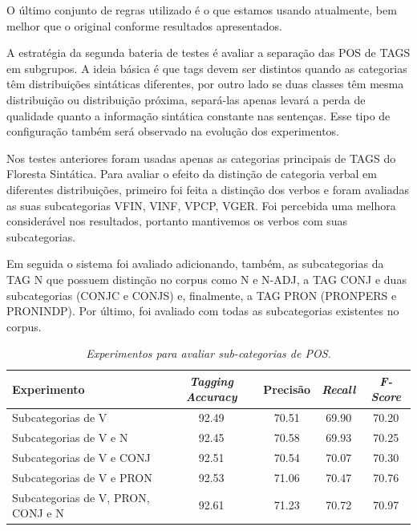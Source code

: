 O último conjunto de regras utilizado é o que estamos usando atualmente, bem melhor que o original conforme resultados apresentados. 

A estratégia da segunda bateria de testes é avaliar a separação das POS de TAGS em subgrupos. A ideia básica é que tags devem ser distintos quando as categorias têm distribuições sintáticas diferentes, por outro lado se duas classes têm mesma distribuição ou distribuição próxima, separá-las apenas levará a perda de qualidade quanto a informação sintática constante nas sentenças. Esse tipo de configuração também será observado na evolução dos experimentos.

Nos testes anteriores foram usadas apenas as categorias principais de TAGS do Floresta Sintática. Para avaliar o efeito da distinção de categoria verbal em diferentes distribuições, primeiro foi feita a distinção dos verbos e foram avaliadas as suas subcategorias VFIN, VINF, VPCP, VGER. Foi percebida uma melhora considerável nos resultados, portanto mantivemos os verbos com suas subcategorias. 

Em seguida o sistema foi avaliado adicionando, também, as subcategorias da TAG N que possuem distinção no corpus como N e N-ADJ, a TAG CONJ e duas subcategorias (CONJC e CONJS) e, finalmente, a TAG PRON (PRONPERS e PRONINDP). Por último, foi avaliado com todas as subcategorias existentes no corpus.


\begin{table}[H]
\centering
\footnotesize
\caption{\it Experimentos para avaliar sub-categorias de POS.}
	\begin{tabular}{|l|c|c|c|c|}
		\hline
		\textbf{Experimento} &  \textbf{\emph{Tagging Accuracy}} & \textbf{Precisão} & \textbf{\emph{Recall}} & \textbf{\emph{F-Score}} \\
		\hline
		Subcategorias de V & 92.49 & 70.51 & 69.90 & 70.20\\
		\hline		
		Subcategorias de V e N & 92.45 & 70.58 & 69.93 & 70.25\\
		\hline		
		Subcategorias de V e CONJ & 92.51 & 70.54 & 70.07 & 70.30\\
		\hline		
		Subcategorias de V e PRON & 92.53 & 71.06 & 70.47 & 70.76\\
		\hline
		Subcategorias de V, PRON, CONJ e N & 92.61 & 71.23 & 70.72 & 70.97\\
		\hline
	\end{tabular}
	\label{tab:segundo_experimento}
\end{table}

